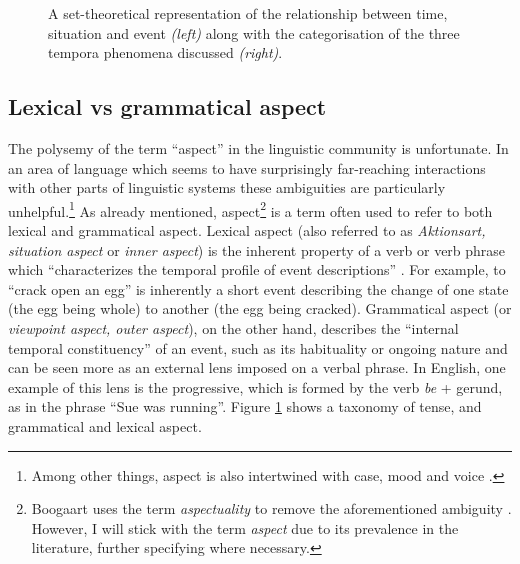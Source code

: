 \begin{figure}
    \hspace{2cm}
    \caption{A set-theoretical representation of the relationship between time, situation and event \emph{(left)} along with the categorisation of the three tempora phenomena discussed \emph{(right)}.}
    \label{fig:TimeSitEvent}
\end{figure}

\subsection{Lexical vs grammatical aspect}
The polysemy of the term “aspect” in the linguistic community is unfortunate. In an area of language which seems to have surprisingly far-reaching interactions with other parts of linguistic systems these ambiguities are particularly unhelpful.\footnote{Among other things, aspect is also intertwined with case, mood and voice \citep{franks2005slavic, Kiparsky2004PartitiveCA}.}
As already mentioned, aspect\footnote{Boogaart uses the term \emph{aspectuality} to remove the aforementioned ambiguity \citep{Boogaart+2004+1165+1180}. However, I will stick with the term \emph{aspect} due to its prevalence in the literature, further specifying where necessary.} is a term often used to refer to both lexical and grammatical aspect. Lexical aspect (also referred to as \emph{Aktionsart, situation aspect} or \emph{inner aspect}) is the inherent property of a verb or verb phrase which “characterizes the temporal profile of event descriptions” \citep{10.1093/oxfordhb/9780199601264.013.25}. For example, to “crack open an egg” is inherently a short event describing the change of one state (the egg being whole) to another (the egg being cracked). Grammatical aspect (or \emph{viewpoint aspect, outer aspect}), on the other hand, describes the “internal temporal constituency” \citep{comrie1976aspect} of an event, such as its habituality or ongoing nature and can be seen more as an external lens imposed on a verbal phrase. In English, one example of this lens is the progressive, which is formed by the verb \emph{be} + gerund, as in the phrase “Sue was running”. Figure \ref{fig:TimeSitEvent} shows a taxonomy of tense, and grammatical and lexical aspect.

